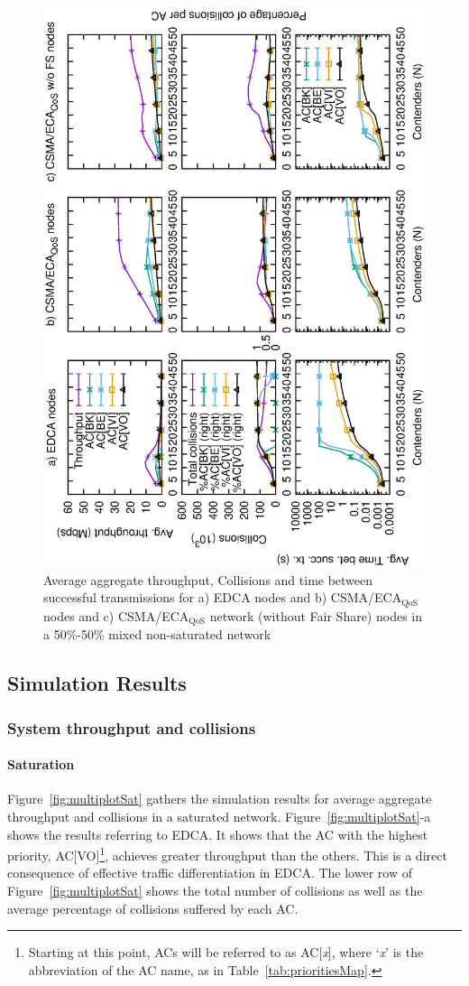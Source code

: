 \begin{figure}[t]
	\centering
		\includegraphics[width=0.55\linewidth,angle = -90]{figures/multiplot-combined-unsat-error-0-1.eps}
		\caption{Average aggregate throughput, Collisions and time between successful transmissions for a) EDCA nodes and b) CSMA/ECA$_{\text{QoS}}$ nodes and c) CSMA/ECA$_{\text{QoS}}$ network (without Fair Share) nodes in a 50\%-50\% mixed non-saturated network}
		\label{fig:multiplotCombinedUnsat}
\end{figure}

\subsection{Simulation Results}\label{sim:results}
\subsubsection{System throughput and collisions}

\paragraph{Saturation} Figure~\ref{fig:multiplotSat} gathers the simulation results for average aggregate throughput and collisions in a saturated network. Figure~\ref{fig:multiplotSat}-a shows the results referring to EDCA. It shows that the AC with the highest priority, AC[VO]\footnote{Starting at this point, ACs will be referred to as AC[\emph{x}], where `\emph{x}' is the abbreviation of the AC name, as in Table~\ref{tab:prioritiesMap}.}, achieves greater throughput than the others. This is a direct consequence of effective traffic differentiation in EDCA. The lower row of Figure~\ref{fig:multiplotSat} shows the total number of collisions as well as the average percentage of collisions suffered by each AC. 

